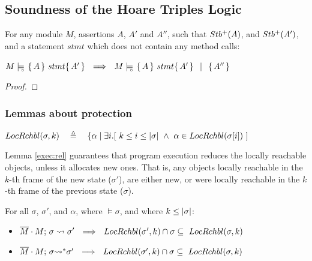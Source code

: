 \subsection{Soundness of the Hoare Triples Logic}
\label{s:sound:app:triples}

\begin{auxLemma}
\label{l:no:call}
For any module $M$, assertions $A$, $A'$ and $A''$, such that ${Stb^+( A )}$, and ${Stb^+( A' )}$, and a statement $stmt$ which does not contain any method calls:
\begin{center}
$  \satisfiesD {M} {\triple {A} {stmt} {A'} }  \ \ \Longrightarrow\ \  \satisfiesD {M} {\quadruple {A} {stmt} {A'} {A''}}$
\end{center}
\end{auxLemma}

\begin{proof}

\end{proof}


\subsubsection{Lemmas about protection}
\label{s:app:protect:lemmas}

\begin{definition}

$\LRelevantKO  {\sigma} {k}\ \ \ \triangleq\ \ \  \{ \alpha \mid  \exists i.[ \ k \leq i \leq \depth \sigma \ \wedge \ \alpha \in \LRelevantO  {\RestictTo \sigma i}\ ]$
\end{definition}
 
Lemma \ref{exec:rel} guarantees that  program execution reduces the locally reachable objects, unless it allocates new ones.
That is, any objects locally reachable in the $k$-th frame of the new state ($\sigma'$), are either new, or were locally reachable in the $k$-th frame of the previous state ($\sigma$).

{
\begin{lemma} For all $\sigma$, $\sigma'$, and $\alpha$, where $\models \sigma$, and where $k\leq |\sigma|$:
\label{exec:rel}
\begin{itemize}
\item
$\leadstoBounded  {\Mtwo\cdot M}  {\sigma}  {\sigma'}\ \  \Longrightarrow\ \ 
  \LRelevantKO   {\sigma'} {k}\cap \sigma   \subseteq\   \LRelevantKO {\sigma} {k}  $
\item
$\leadstoBoundedStar  {\Mtwo\cdot M}  {\sigma}  {\sigma'}\ \  \Longrightarrow\ \ 
  \LRelevantKO   {\sigma'} {k}\cap \sigma   \subseteq\   \LRelevantKO {\sigma} {k} $
\end{itemize}
\end{lemma}
 }
 
